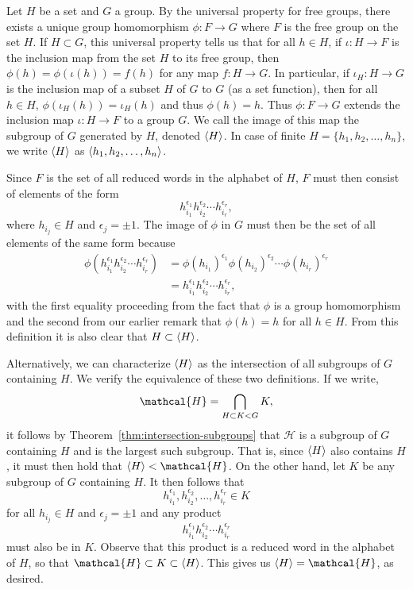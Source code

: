 \begin{example}
    \label{ex:subgroup-generated-by-set}
    Let \(H\) be a set and \(G\) a group. By the universal property for free
    groups, there exists a unique group homomorphism \(\phi: F \to G\) where
    \(F\) is the free group on the set \(H\). If \(H \subset G\), this universal
    property tells us that for all \(h \in H\), if \(\iota: H \to F\) is the
    inclusion map from the set \(H\) to its free group, then \(\phi(h) =
    \phi(\iota(h)) = f(h)\) for any map \(f : H \to G\). In particular, if
    \(\iota_H: H \to G\) is the inclusion map of a subset \(H\) of \(G\) to
    \(G\) (as a set function), then for all \(h \in H\), \(\phi(\iota_{H}(h)) =
    \iota_H(h)\) and thus \(\phi(h) = h\). Thus \(\phi: F \to G\) extends the
    inclusion map \(\iota: H \to F\) to a group \(G\). We call the image of this
    map the subgroup of \(G\) generated by \(H\), denoted \(\langle H \rangle\). In case
    of finite \(H = \{h_1, h_2, \ldots, h_n\}\), we write \(\langle H \rangle\) as
    \(\langle h_1, h_2, \ldots, h_n \rangle\).

    Since \(F\) is the set of all reduced words in the alphabet of \(H\), \(F\)
    must then consist of elements of the form
    \[
        h_{i_1}^{\epsilon_1} h_{i_2}^{\epsilon_2} \cdots h_{i_r}^{\epsilon_r},
    \]
    where \(h_{i_j} \in H\) and \(\epsilon_j = \pm 1\). The image of \(\phi\) in
    \(G\) must then be the set of all elements of the same form because
    \begin{align*}
        \phi(h_{i_1}^{\epsilon_1} h_{i_2}^{\epsilon_2} \cdots h_{i_r}^{\epsilon_r}) & = \phi(h_{i_1})^{\epsilon_1} \phi(h_{i_2})^{\epsilon_2} \cdots \phi(h_{i_r})^{\epsilon_r} \\
        & = h_{i_1}^{\epsilon_1} h_{i_2}^{\epsilon_2} \cdots h_{i_r}^{\epsilon_r},
    \end{align*}
    with the first equality proceeding from the fact that \(\phi\) is a group
    homomorphism and the second from our earlier remark that \(\phi(h) = h\) for
    all \(h \in H\). From this definition it is also clear that \(H \subset
    \langle H \rangle\).

    Alternatively, we can characterize \(\langle H \rangle\) as the intersection of all
    subgroups of \(G\) containing \(H\). We verify the equivalence of these two
    definitions. If we write,
    \[
        \mathcal{H} = \bigcap_{H \subset K \subgroup G} K,
    \]
    it follows by Theorem~\ref{thm:intersection-subgroups} that \(\mathcal{H}\)
    is a subgroup of \(G\) containing \(H\) and is the largest such subgroup.
    That is, since \(\langle H \rangle\) also contains \(H\), it must then hold that
    \(\gen{H} \subgroup \mathcal{H}\). On the other hand, let \(K\) be any
    subgroup of \(G\) containing \(H\). It then follows that
    \[
        h_{i_1}^{\epsilon_1}, h_{i_2}^{\epsilon_2}, \ldots, h_{i_r}^{\epsilon_r} \in K
    \]
    for all \(h_{i_j} \in H\) and \(\epsilon_j = \pm 1\) and any product
    \[
        h_{i_1}^{\epsilon_1} h_{i_2}^{\epsilon_2} \cdots h_{i_r}^{\epsilon_r}
    \]
    must also be in \(K\). Observe that this product is a reduced word in the
    alphabet of \(H\), so that \(\mathcal{H} \subset K \subset \gen{H}\). This
    gives us \(\gen{H} = \mathcal{H}\), as desired.


\end{example}
